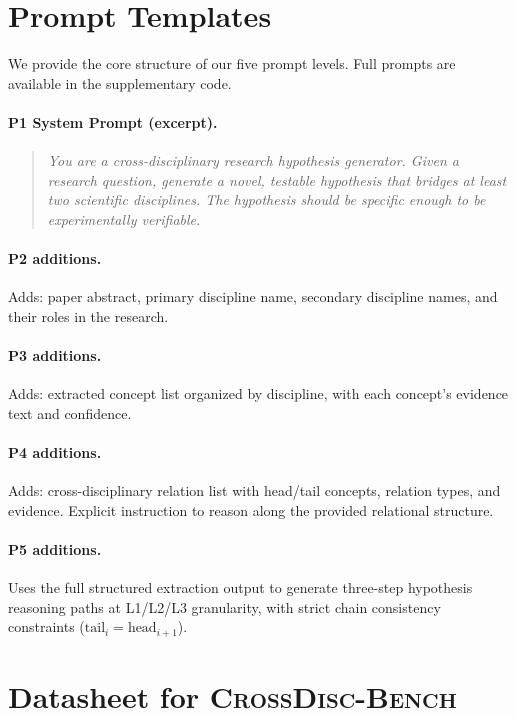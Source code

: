\documentclass{article}
\newcommand{\ours}{\textsc{CrossDisc-Bench}}
\begin{document}
\section{Prompt Templates}
\label{app:prompts}

We provide the core structure of our five prompt levels. Full prompts are available in the supplementary code.

\paragraph{P1 System Prompt (excerpt).}
\begin{quote}
\small\itshape
You are a cross-disciplinary research hypothesis generator. Given a research question, generate a novel, testable hypothesis that bridges at least two scientific disciplines. The hypothesis should be specific enough to be experimentally verifiable.
\end{quote}

\paragraph{P2 additions.}
Adds: paper abstract, primary discipline name, secondary discipline names, and their roles in the research.

\paragraph{P3 additions.}
Adds: extracted concept list organized by discipline, with each concept's evidence text and confidence.

\paragraph{P4 additions.}
Adds: cross-disciplinary relation list with head/tail concepts, relation types, and evidence. Explicit instruction to reason along the provided relational structure.

\paragraph{P5 additions.}
Uses the full structured extraction output to generate three-step hypothesis reasoning paths at L1/L2/L3 granularity, with strict chain consistency constraints ($\text{tail}_i = \text{head}_{i+1}$).

\section{Datasheet for \ours{}}
\label{app:datasheet}
\end{document}
